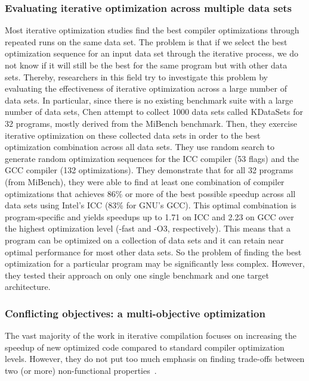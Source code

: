 \subsubsection{Evaluating iterative optimization across multiple data sets}
Most iterative optimization studies find the best compiler optimizations through repeated runs on the same data set. The problem is that if we select the best optimization sequence for an input data set through the iterative process, we do not know if it will still be the best for the same program but with other data sets. Thereby, researchers in this field try to investigate this problem by evaluating the effectiveness of iterative optimization across a large number of data sets. In particular, since there is no existing benchmark suite with a large number of data sets, Chen \etal\cite{chen2010evaluating} attempt to collect 1000 data sets called KDataSets for 32 programs, mostly derived from the MiBench benchmark. Then, they exercise iterative optimization on these collected data sets in order to  the best optimization combination across all data sets. 
They use random search to generate random optimization sequences for the ICC compiler (53 flags) and the GCC compiler (132 optimizations).
They demonstrate that for all 32 programs (from MiBench), they were able to find at least one combination of compiler optimizations that achieves 86\% or more of the best possible speedup across all data sets using Intel’s ICC (83\% for GNU’s GCC). This optimal combination is program-specific and yields speedups up to 1.71 on ICC and 2.23 on GCC over the highest optimization level (-fast and -O3, respectively). This means that a program can be optimized on a collection of data sets and it can retain near optimal performance for most other data sets. So the problem of finding the best optimization for a particular program may be significantly less complex. However, they tested their approach on only one single benchmark and one target architecture.




\subsubsection{Conflicting objectives: a multi-objective optimization}
The vast majority of the work in iterative compilation focuses on increasing the speedup of new optimized code compared to standard compiler optimization levels. However, they do not put too much emphasis on finding trade-offs between two (or more) non-functional properties~\cite{almagor2004finding,hoste2008cole,pan2006fast,pallister2015identifying,chen2012deconstructing,martins2014exploration,lin2008automatic,martinez2014multi}.

